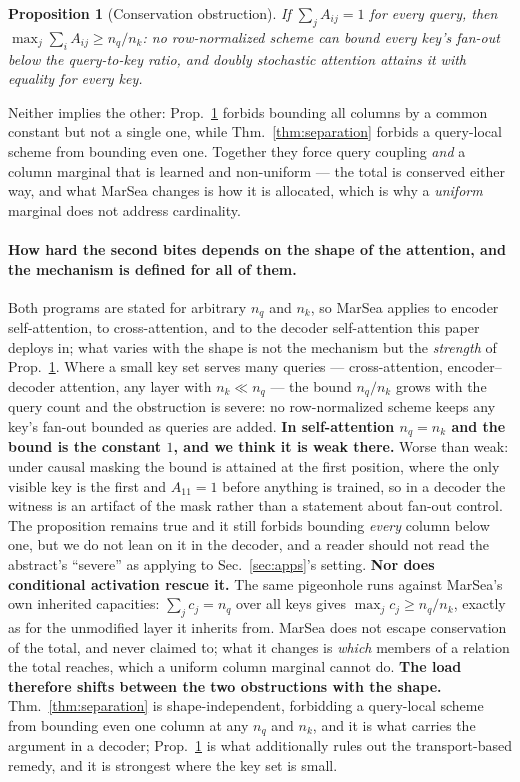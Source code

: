 \documentclass{article}
\newtheorem{proposition}{Proposition}
\begin{document}
\begin{proposition}[Conservation obstruction]
\label{prop:conservation}
If $\sum_j A_{ij}=1$ for every query, then $\max_j \sum_i A_{ij} \ge n_q/n_k$: no row-normalized
scheme can bound \emph{every} key's fan-out below the query-to-key ratio, and doubly stochastic
attention attains it with equality for every key.
\end{proposition}

Neither implies the other: Prop.~\ref{prop:conservation} forbids bounding all columns by a common
constant but not a single one, while Thm.~\ref{thm:separation} forbids a query-local scheme from
bounding even one. Together they force query coupling \emph{and} a column marginal that is
learned and non-uniform --- the total is conserved either way, and what MarSea changes is how it is
allocated, which is why a \emph{uniform} marginal does not address cardinality.

\paragraph{How hard the second bites depends on the shape of the attention, and the mechanism is
defined for all of them.} Both programs are stated for arbitrary $n_q$ and $n_k$, so MarSea
applies to encoder self-attention, to cross-attention, and to the decoder self-attention this
paper deploys in; what varies with the shape is not the mechanism but the \emph{strength} of
Prop.~\ref{prop:conservation}. Where a small key set serves many queries --- cross-attention,
encoder--decoder attention, any layer with $n_k \ll n_q$ --- the bound $n_q/n_k$ grows with the
query count and the obstruction is severe: no row-normalized scheme keeps any key's fan-out
bounded as queries are added. \textbf{In self-attention $n_q=n_k$ and the bound is the constant $1$, and we think it is weak
there.} Worse than weak: under causal masking the bound is attained at the first position, where
the only visible key is the first and $A_{11}=1$ before anything is trained, so in a decoder the
witness is an artifact of the mask rather than a statement about fan-out control. The proposition
remains true and it still forbids bounding \emph{every} column below one, but we do not lean on
it in the decoder, and a reader should not read the abstract's ``severe'' as applying to
Sec.~\ref{sec:apps}'s setting. \textbf{Nor does conditional activation rescue it.} The same
pigeonhole runs against MarSea's own inherited capacities: $\sum_j c_j = n_q$ over all keys gives
$\max_j c_j \ge n_q/n_k$, exactly as for the unmodified layer it inherits from. MarSea does not
escape conservation of the total, and never claimed to; what it changes is \emph{which} members
of a relation the total reaches, which a uniform column marginal cannot do.
\textbf{The load therefore shifts between the two obstructions with the shape.}
Thm.~\ref{thm:separation} is shape-independent, forbidding a query-local scheme from bounding
even one column at any $n_q$ and $n_k$, and it is what carries the argument in a decoder;
Prop.~\ref{prop:conservation} is what additionally rules out the transport-based remedy, and it
is strongest where the key set is small.
\end{document}
